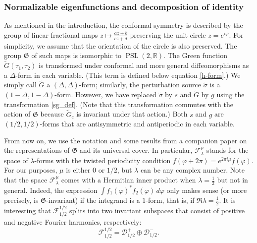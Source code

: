 \documentclass[12pt]{article}
\newcommand{\ph}{\varphi}
\newcommand{\calD}{\mathcal{D}}
\newcommand{\calF}{\mathcal{F}}
\newcommand{\RR}{\mathbb{R}}
\DeclareMathOperator{\PSL}{PSL}
\newcommand{\GG}{\mathfrak{G}}
\newcommand{\cc}{\mathrm{c}}
\newcommand{\tG}{\widetilde{G}}
\newcommand{\tsig}{\tilde{\sigma}}
\newcommand{\vp}{\varphi}
\begin{document}
\subsubsection{Normalizable eigenfunctions and decomposition of identity}
\label{sec_normeig}

As mentioned in the introduction, the conformal symmetry is described by the group of linear fractional maps $z\mapsto\frac{az+b}{cz+d}$ preserving the unit circle $z=e^{i\ph}$. For simplicity, we assume that the orientation of the circle is also preserved. The group $\GG$ of such maps is isomorphic to $\PSL(2,\RR)$. The Green function $\tG(\tau_1,\tau_2)$ is transformed under conformal and more general diffeomorphisms as a $\Delta$-form in each variable. (This term is defined below equation \eqref{h-form}.) We simply call $\tG$ a $(\Delta,\Delta)$-form; similarly, the perturbation source $\tsig$ is a $(1-\Delta,1-\Delta)$-form. However, we have replaced $\tsig$ by $s$ and $\tG$ by $g$ using the transformation \eqref{sg_def}. (Note that this transformation commutes with the action of $\GG$ because $\tG_{\cc}$ is invariant under that action.) Both $s$ and $g$ are $(1/2,1/2)$-forms that are antisymmetric and antiperiodic in each variable.

From now on, we use the notation and some results from a companion paper \cite{SL2R} on the representations of $\GG$ and its universal cover. In particular, $\calF^\mu_\lambda$ stands for the space of $\lambda$-forms with the twisted periodicity condition $f(\vp+2\pi)=e^{2\pi i\mu}f(\vp)$. For our purposes, $\mu$ is either $0$ or $1/2$, but $\lambda$ can be any complex number. Note that the space $\calF^\mu_\lambda$ comes with a Hermitian inner product when $\lambda=\frac{1}{2}$ but not in general. Indeed, the expression $\int f_1(\vp)^*f_2(\vp)\,d\vp$ only makes sense (or more precisely, is $\GG$-invariant) if the integrand is a $1$-form, that is, if $\Re\lambda=\frac{1}{2}$. It is interesting that $\calF^{1/2}_{1/2}$ splits into two invariant subspaces that consist of positive and negative Fourier harmonics, respectively:
\begin{equation}
\calF^{1/2}_{1/2}=\calD^{+}_{1/2}\oplus\calD^{-}_{1/2}.
\end{equation}
\end{document}
